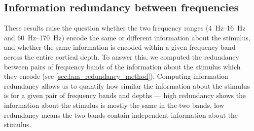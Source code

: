 \subsection{Information redundancy between frequencies}

These results raise the question whether the two frequency ranges (\SIrange{4}{16}{Hz} and \SIrange{60}{170}{Hz}) encode the same or different information about the stimulus, and whether the same information is encoded within a given frequency band across the entire cortical depth. 
To answer this, we computed the redundancy between pairs of frequency bands of the information about the stimulus which they encode (see \autoref{sec:lam_redundancy_method}).
Computing information redundancy allows us to quantify how similar the information about the stimulus is for a given pair of frequency bands and depths --- high redundancy shows the information about the stimulus is mostly the same in the two bands, low redundancy means the two bands contain independent information about the stimulus.

